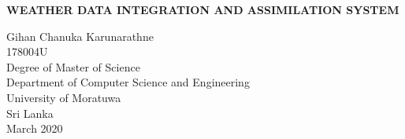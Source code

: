 \documentclass[a4paper,oneside,12pt]{report}
\begin{document}
\begin{titlepage}
    \begin{center}
        \Large{
        \textbf{WEATHER DATA INTEGRATION AND ASSIMILATION SYSTEM}}\\
        \vspace{144pt}
  \large      
       
        
        
        Gihan Chanuka Karunarathne\\
        \vspace{24pt}
      178004U\\
         \vspace{72pt}
        Degree of Master of Science\\
       
        
       \vspace{72pt}
        \large
        Department of Computer Science and Engineering\\
        \vspace{24pt}
        University of Moratuwa\\
        Sri Lanka\\
        \vspace{32pt}
        March 2020
        
    \end{center}
\end{titlepage}
\end{document}
